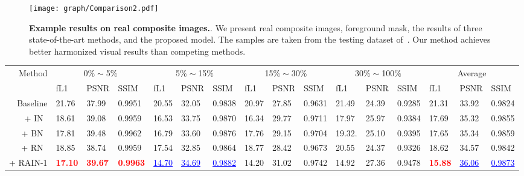 \documentclass[final]{cvpr}
\begin{document}
\begin{figure*}[!htbp]
\begin{center}
\texttt{[image: graph/Comparison2.pdf]}
\end{center}
   \caption{\textbf{Example results on real composite images.}. We present real composite images, foreground mask, the results of three state-of-the-art methods, and the proposed model. The samples are taken from the testing dataset of~\cite{tsai2017deep}. Our method achieves better harmonized visual results than competing methods. }
   \label{fig:comparison2}
\end{figure*}


\begin{table*}[!htp]
\footnotesize
\begin{center}
\begin{tabular}{rp{0.5cm}<{\centering}p{0.6cm}<{\centering}p{0.6cm}<{\centering}p{0.5cm}<{\centering}p{0.6cm}<{\centering}p{0.6cm}<{\centering}p{0.6cm}<{\centering}p{0.6cm}<{\centering}p{0.6cm}<{\centering}p{0.5cm}<{\centering}p{0.6cm}<{\centering}p{0.6cm}<{\centering}p{0.6cm}<{\centering}p{0.6cm}<{\centering}p{0.6cm}<{\centering}}
\toprule
\multirow{2}{*}{Method} & \multicolumn{3}{c}{0$\%\sim$5$\%$} & \multicolumn{3}{c}{5$\%\sim$15$\%$} & \multicolumn{3}{c}{15$\%\sim$30$\%$} & \multicolumn{3}{c}{30$\%\sim$100$\%$}& \multicolumn{3}{c}{Average} \\
\cmidrule(r){2-4}
\cmidrule(r){5-7}
\cmidrule(r){8-10}
\cmidrule(r){11-13}
\cmidrule(r){14-16}
 & fL1  & PSNR & SSIM  & fL1  & PSNR & SSIM &  fL1  & PSNR & SSIM &  fL1  & PSNR & SSIM &  fL1  & PSNR & SSIM \\
\midrule
Baseline & 21.76 & 37.99 & 0.9951 & 20.55 & 32.05 & 0.9838 & 20.97 & 27.85 & 0.9631 & 21.49 & 24.39 & 0.9285 & 21.31 & 33.92 & 0.9824 \\
+ IN~\cite{ulyanov2016instance} & 18.61 & 39.08 & 0.9959 & 16.53 & 33.75 & 0.9870 & 16.34 & 29.77 & 0.9711 & 17.97 & 25.97 & 0.9384 & 17.69 & 35.32 & 0.9855 \\
+ BN~\cite{ioffe2015batch} & 17.81 & 39.48 & 0.9962 & 16.79 & 33.60 & 0.9876 & 17.76 & 29.15 & 0.9704 & 19.32. & 25.10 & 0.9395 & 17.65 & 35.34 & 0.9859 \\
+ RN~\cite{yu2020region} & 18.85 & 38.74 & 0.9959 & 17.54 & 32.85 & 0.9864 & 18.77 & 28.42 & 0.9673 & 20.55 & 24.37 & 0.9326 & 18.62 & 34.57 & 0.9842 \\
\midrule 
+ RAIN-1 & \textcolor{red}{\textbf{17.10}} & \textcolor{red}{\textbf{39.67}} & \textcolor{red}{\textbf{0.9963}} & \textcolor{blue}{\underline{14.70}} & \textcolor{blue}{\underline{34.69}} & \textcolor{blue}{\underline{0.9882}} & 14.20 & 31.02 & {0.9742} & 14.92 & 27.36 & 0.9478 & \textcolor{red}{\textbf{15.88}} & \textcolor{blue}{\underline{36.06}} & \textcolor{blue}{\underline{0.9873}} \\


\end{tabular}
\end{center}
\end{table*}
\end{document}
